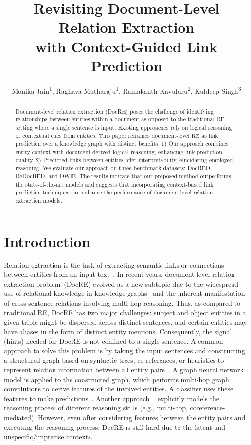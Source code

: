 \documentclass[letterpaper]{article} %
\title{Revisiting Document-Level Relation Extraction \\ with Context-Guided Link Prediction}
\author {
    Monika Jain\textsuperscript{\rm 1},
    Raghava Mutharaju\textsuperscript{\rm 1},
    Ramakanth Kavuluru\textsuperscript{\rm 2},
    Kuldeep Singh\textsuperscript{\rm 3}
}
\begin{document}
\maketitle


\begin{abstract}

Document-level relation extraction (DocRE) poses the challenge of identifying relationships between entities within a document as opposed to the traditional RE setting where a single sentence is input. Existing approaches rely on logical reasoning or contextual cues from entities. This paper reframes document-level RE as link prediction over a knowledge graph with distinct benefits: 1) Our approach combines entity context with document-derived logical reasoning, enhancing link prediction quality. 2) Predicted links between entities offer interpretability, elucidating employed reasoning.
We evaluate our approach on three benchmark datasets: DocRED, ReDocRED, and DWIE. The results indicate that our proposed method outperforms the state-of-the-art models and suggests that incorporating context-based link prediction techniques can enhance the performance of document-level relation extraction models.




\end{abstract}


\section{Introduction}
Relation extraction is the task of extracting semantic links or connections between entities from an input text~\cite{baldini-soares-etal-2019-matching}.
In recent years, document-level relation extraction problem~(DocRE) evolved as a new subtopic due to the widespread use of relational knowledge in knowledge graphs~\cite{yu-etal-2017-improved} and the inherent manifestation of cross-sentence relations involving multi-hop reasoning.
Thus, as compared to traditional RE, DocRE has two major challenges: subject and object entities in a given triple might be dispersed across distinct sentences, and certain entities may have aliases in the form of distinct entity mentions. Consequently, the signal (hints) needed for DocRE is not confined to a single sentence. A common approach to solve this problem is by taking the input sentences and constructing a structured graph based on syntactic trees, co-references, or heuristics to represent relation information between all entity pairs~\cite{nan-etal-2020-reasoning}. A graph neural network model is applied to the constructed graph, which performs multi-hop graph convolutions to derive features of the involved entities. A classifier uses these features to make predictions~\cite{DBLP:conf/aaai/ZhangCZW20}. Another approach ~\cite{xu-etal-2021-discriminative,10.1145/3572898} explicitly models the reasoning process of different reasoning skills (e.g., multi-hop, coreference-mediated). However, even after considering features between the entity pairs and executing the reasoning process, DocRE is still hard due to the latent and unspecific/imprecise contexts.
\end{document}
